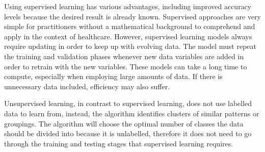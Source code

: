 \documentclass[../thesis.tex]{subfiles}
\begin{document}
\begin{table}[h!]
    \centering{}
    \caption{Supervised learning methods and their applications across healthcare.}
    \label{tab:supervised}
\end{table}

Using supervised learning has various advantages, including improved accuracy levels because the desired result is already known. Supervised approaches are very simple for practitioners without a mathematical background to comprehend and apply in the context of healthcare. However, supervised learning models always require updating in order to keep up with evolving data. The model must repeat the training and validation phases whenever new data variables are added in order to retrain with the new variables. These models can take a long time to compute, especially when employing large amounts of data. If there is unnecessary data included, efficiency may also suffer.

Unsupervised learning, in contrast to supervised learning, does not use labelled data to learn from, instead, the algorithm identifies clusters of similar patterns or groupings. The algorithm will choose the optimal number of classes the data should be divided into because it is unlabelled, therefore it does not need to go through the training and testing stages that supervised learning requires.
\end{document}
